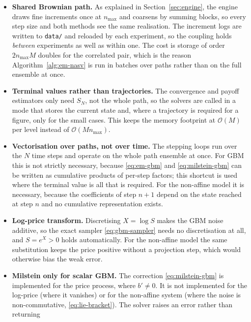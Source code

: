 \documentclass[11pt,a4paper]{article}
\theoremstyle{definition}
\theoremstyle{remark}
\begin{document}
\begin{itemize}
\item \textbf{Shared Brownian path.} As explained in Section~\ref{sec:engine},
      the engine draws fine increments once at $n_{\max}$ and coarsens by
      summing blocks, so every step size and both methods see the same
      realisation. The increment logs are written to \texttt{data/} and
      reloaded by each experiment, so the coupling holds \emph{between}
      experiments as well as within one. The cost is storage of order
      $2 n_{\max} M$ doubles for the correlated pair, which is the reason
      Algorithm~\ref{alg:em-nasv} is run in batches over paths rather than on
      the full ensemble at once.
\item \textbf{Terminal values rather than trajectories.} The convergence and
      payoff estimators only need $S_N$, not the whole path, so the solvers are
      called in a mode that stores the current state and, where a trajectory is
      required for a figure, only for the small cases. This keeps the memory
      footprint at $\mathcal{O}(M)$ per level instead of
      $\mathcal{O}(M n_{\max})$.
\item \textbf{Vectorisation over paths, not over time.} The stepping loops run
      over the $N$ time steps and operate on the whole path ensemble at once.
      For GBM this is not strictly necessary, because \eqref{eq:em-gbm} and
      \eqref{eq:milstein-gbm} can be written as cumulative products of per-step
      factors; this shortcut is used where the terminal value is all that is
      required. For the non-affine model it is necessary, because the
      coefficients of step $n+1$ depend on the state reached at step $n$ and no
      cumulative representation exists.
\item \textbf{Log-price transform.} Discretising $X = \log S$ makes the GBM
      noise additive, so the exact sampler \eqref{eq:gbm-sampler} needs no
      discretisation at all, and $S = e^{X} > 0$ holds automatically. For the
      non-affine model the same substitution keeps the price positive without a
      projection step, which would otherwise bias the weak error.
\item \textbf{Milstein only for scalar GBM.} The correction
      \eqref{eq:milstein-gbm} is implemented for the price process, where
      $b' \ne 0$. It is not implemented for the log-price (where it vanishes)
      or for the non-affine system (where the noise is non-commutative,
      \eqref{eq:lie-bracket}). The solver raises an error rather than returning

\end{itemize}
\end{document}
